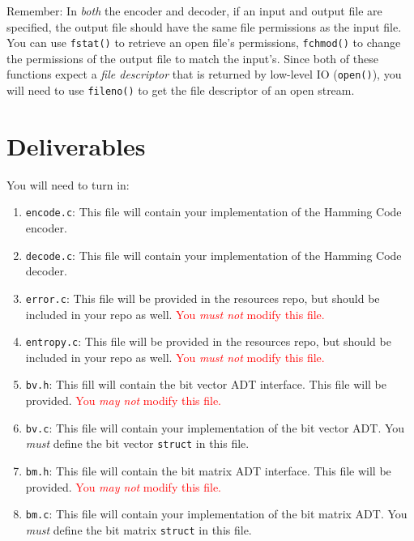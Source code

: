 \documentclass[11pt]{article}
\begin{document}
Remember: In \emph{both} the encoder and decoder, if an input and output
file are specified, the output file should have the same file
permissions as the input file. You can use \texttt{fstat()} to retrieve
an open file's permissions, \texttt{fchmod()} to change the permissions
of the output file to match the input's. Since both of these functions
expect a \emph{file descriptor} that is returned by low-level IO
(\texttt{open()}), you will need to use \texttt{fileno()} to get the
file descriptor of an open stream.

\section{Deliverables}

\noindent You will need to turn in:
\begin{enumerate}
  \item \texttt{encode.c}: This file will contain your implementation of the
    Hamming Code encoder.

  \item \texttt{decode.c}: This file will contain your implementation of the
    Hamming Code decoder.

  \item \texttt{error.c}: This file will be provided in the resources
    repo, but should be included in your repo as well.
    \textcolor{red}{You \emph{must not} modify this file.}

  \item \texttt{entropy.c}: This file will be provided in the resources
    repo, but should be included in your repo as well.
    \textcolor{red}{You \emph{must not} modify this file.}

  \item \texttt{bv.h}: This fill will contain the bit vector ADT interface. This file
  will be provided. \textcolor{red}{You \emph{may not} modify this file.}

  \item \texttt{bv.c}: This file will contain your implementation of the bit vector ADT.
    You \emph{must} define the bit vector \texttt{struct} in this file.

  \item \texttt{bm.h}: This file will contain the bit matrix ADT interface. This file
  will be provided. \textcolor{red}{You \emph{may not} modify this file.}

  \item \texttt{bm.c}: This file will contain your implementation of the
    bit matrix ADT. You \emph{must} define the bit matrix
    \texttt{struct} in this file.


\end{enumerate}
\end{document}
